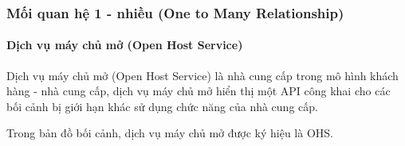 







\subsubsection{Mối quan hệ 1 - nhiều (One to Many Relationship)}

\paragraph{Dịch vụ máy chủ mở (Open Host Service)} 






Dịch vụ máy chủ mở (Open Host Service) là nhà cung cấp trong mô hình khách hàng - nhà cung cấp, dịch vụ máy chủ mở hiển thị một API công khai cho các bối cảnh bị giới hạn khác sử dụng chức năng của nhà cung cấp.

Trong bản đồ bối cảnh, dịch vụ máy chủ mở được ký hiệu là OHS.













